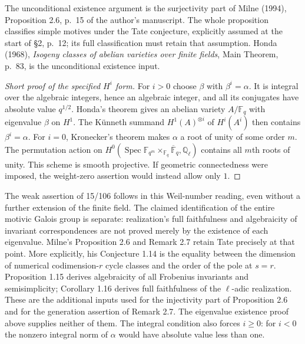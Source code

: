 The unconditional existence argument is the surjectivity
part of Milne (1994), Proposition 2.6, p.~15 of the author's
manuscript. The whole proposition classifies simple motives
under the Tate conjecture, explicitly assumed at the start
of \S2, p.~12; its full classification must retain that
assumption. Honda (1968), \emph{Isogeny classes of abelian
varieties over finite fields}, Main Theorem, p.~83, is
the unconditional existence input.
\begin{proof}[Short proof of the specified $H^i$ form]
For $i>0$ choose $\beta$ with $\beta^i=\alpha$.
It is integral over the algebraic integers, hence an
algebraic integer, and all its conjugates have absolute
value $q^{1/2}$. Honda's theorem gives an abelian variety
$A/\mathbb F_q$ with eigenvalue $\beta$ on $H^1$.
The K\"unneth summand $H^1(A)^{\otimes i}$ of $H^i(A^i)$
then contains $\beta^i=\alpha$.
For $i=0$, Kronecker's theorem makes $\alpha$ a root of
unity of some order $m$. The permutation action on
$H^0(\operatorname{Spec}\mathbb F_{q^m}
\times_{\mathbb F_q}\overline{\mathbb F}_q,\mathbb Q_\ell)$
contains all $m$th roots of unity. This scheme is smooth
projective. If geometric connectedness were imposed,
the weight-zero assertion would instead allow only $1$.
\end{proof}
The weak assertion of 15/106 follows in this Weil-number
reading, even without a further extension of the finite
field. The claimed identification of the entire motivic
Galois group is separate: realization's full faithfulness
and algebraicity of invariant correspondences are not
proved merely by the existence of each eigenvalue.
Milne's Proposition 2.6 and Remark 2.7 retain Tate precisely
at that point.
More explicitly, his Conjecture 1.14 is the equality
between the dimension of numerical codimension-$r$
cycle classes and the order of the pole at $s=r$.
Proposition 1.15 derives algebraicity of all Frobenius
invariants and semisimplicity; Corollary 1.16 derives
full faithfulness of the $\ell$-adic realization.
These are the additional inputs used for the
injectivity part of Proposition 2.6 and for the
generation assertion of Remark 2.7. The eigenvalue
existence proof above supplies neither of them.
The integral condition also forces $i\geq0$:
for $i<0$ the nonzero integral norm of $\alpha$
would have absolute value less than one.

